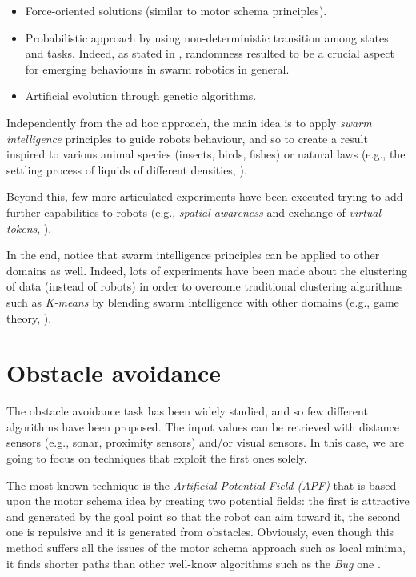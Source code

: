 \begin{itemize}

  \item Force-oriented solutions (similar to motor schema principles).
  \item Probabilistic approach by using non-deterministic transition among states and tasks. Indeed, as stated in \cite{clustering-randomness} \cite{clustering-data}, randomness resulted to be a crucial aspect for emerging behaviours in swarm robotics in general. 
  \item Artificial evolution through genetic algorithms. 

\end{itemize}

Independently from the ad hoc approach, the main idea is to apply \textit{swarm intelligence} principles to guide robots behaviour, and so to create a result inspired to various animal species (insects, birds, fishes) or natural laws (e.g., the settling process of liquids of different densities, \cite{clustering-natural}). 

\noindent
Beyond this, few more articulated experiments have been executed trying to add further capabilities to robots (e.g., \textit{spatial awareness} and exchange of \textit{virtual tokens}, \cite{clustering-awareness}).

\noindent
In the end, notice that swarm intelligence principles can be applied to other domains as well. Indeed, lots of experiments have been made about the clustering of data (instead of robots) in order to overcome traditional clustering algorithms such as \textit{K-means} by blending swarm intelligence with other domains (e.g., game theory, \cite{clustering-data}). 

\section{Obstacle avoidance}

The obstacle avoidance task has been widely studied, and so few different algorithms have been proposed. 
The input values can be retrieved with distance sensors (e.g., sonar, proximity sensors) and/or visual sensors. In this case, we are going to focus on techniques that exploit the first ones solely.

\smallskip
The most known technique is the \textit{Artificial Potential Field (APF)} that is based upon the motor schema idea by creating two potential fields: the first is attractive and generated by the goal point so that the robot can aim toward it, the second one is repulsive and it is generated from obstacles. Obviously, even though this method suffers all the issues of the motor schema approach such as local minima, it finds shorter paths than other well-know algorithms such as the \textit{Bug} one \cite{obstacle-summary} \cite{obstacle-summary-2}.

